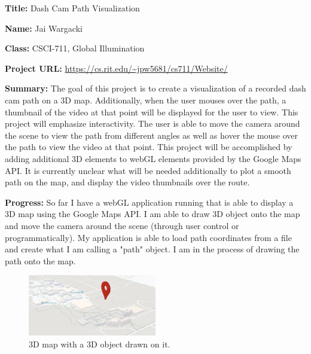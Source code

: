 \documentclass{article}
\begin{document}
\textbf{Title:} Dash Cam Path Visualization

\textbf{Name:} Jai Wargacki

\textbf{Class:} CSCI-711, Global Illumination

\textbf{Project URL:} \url{https://cs.rit.edu/~jpw5681/cs711/Website/}

\textbf{Summary:} The goal of this project is to create a visualization of a recorded dash cam path on a 3D map.
Additionally, when the user mouses over the path, a thumbnail of the video at that point will be displayed for the user to view.
This project will emphasize interactivity. The user is able to move the camera around the scene to view the path from different angles
as well as hover the mouse over the path to view the video at that point. This project will be accomplished by adding additional 3D elements to 
webGL elements provided by the Google Maps API. It is currently unclear what will be needed additionally to plot a smooth path on the map, and
display the video thumbnails over the route.

\textbf{Progress:} So far I have a webGL application running that is able to display a 3D map using the Google Maps API. 
I am able to draw 3D object onto the map and move the camera around the scene (through user control or programmatically).
My application is able to load path coordinates from a file and create what I am calling a "path" object. I am 
in the process of drawing the path onto the map.

\begin{figure}[h]
\centering
\includegraphics[width=0.5\textwidth]{screenshot.png}
\caption{3D map with a 3D object drawn on it.}
\end{figure}
\end{document}
